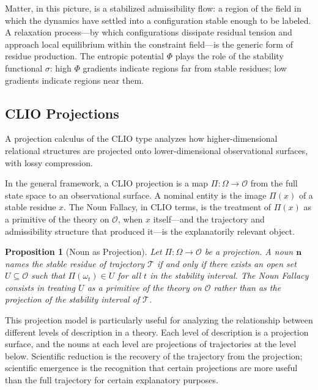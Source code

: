 \documentclass[12pt, a4paper]{article}
\theoremstyle{plain}
\newtheorem{proposition}[theorem]{Proposition}
\theoremstyle{definition}
\theoremstyle{remark}
\begin{document}
Matter, in this picture, is a stabilized admissibility flow: a region of the
field in which the dynamics have settled into a configuration stable enough to
be labeled. A relaxation process---by which configurations dissipate residual
tension and approach local equilibrium within the constraint field---is the
generic form of residue production. The entropic potential $\Phi$ plays the
role of the stability functional $\sigma$: high $\Phi$ gradients indicate
regions far from stable residues; low gradients indicate regions near them.

\subsection{CLIO Projections}

A projection calculus of the CLIO type analyzes how higher-dimensional
relational structures are projected onto lower-dimensional observational
surfaces, with lossy compression.

In the general framework, a CLIO projection is a map $\Pi: \Omega \to
\mathcal{O}$ from the full state space to an observational surface. A nominal
entity is the image $\Pi(x)$ of a stable residue $x$. The Noun Fallacy,
in CLIO terms, is the treatment of $\Pi(x)$ as a primitive of the theory on
$\mathcal{O}$, when $x$ itself---and the trajectory and admissibility structure
that produced it---is the explanatorily relevant object.

\begin{proposition}[Noun as Projection]
Let $\Pi: \Omega \to \mathcal{O}$ be a projection. A noun $\mathbf{n}$ names
the stable residue of trajectory $\mathcal{T}$ if and only if there exists
an open set $U \subseteq \mathcal{O}$ such that $\Pi(\omega_t) \in U$ for
all $t$ in the stability interval. The Noun Fallacy consists in treating $U$
as a primitive of the theory on $\mathcal{O}$ rather than as the projection
of the stability interval of $\mathcal{T}$.
\end{proposition}

This projection model is particularly useful for analyzing the relationship
between different levels of description in a theory. Each level of description
is a projection surface, and the nouns at each level are projections of
trajectories at the level below. Scientific reduction is the recovery of the
trajectory from the projection; scientific emergence is the recognition that
certain projections are more useful than the full trajectory for certain
explanatory purposes.
\end{document}
